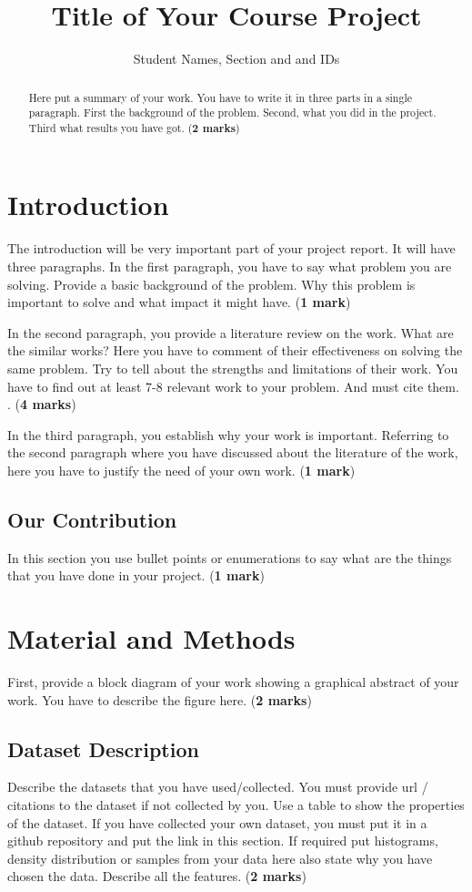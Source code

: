 \documentclass{article}
\title{Title of Your Course Project}
\author{Student Names, Section and and IDs}
\date{}
\begin{document}
\maketitle
\begin{abstract}
    Here put a summary of your work. You have to write it in three parts in a single paragraph. First the background of the problem. Second, what you did in the project. Third what results you have got. (\textbf{2 marks})
\end{abstract}

\section{Introduction} 
The introduction will be very important part of your project report. It will have three paragraphs. In the first paragraph, you have to say what problem you are solving. Provide a basic background of the problem. Why this problem is important to solve and what impact it might have. (\textbf{1 mark})

In the second paragraph, you provide a literature review on the work. What are the similar works? Here you have to comment of their effectiveness on solving the same problem. Try to tell about the strengths and limitations of their work. You have to find out at least 7-8 relevant work to your problem. And must cite them. \cite{jones2004introduction}. (\textbf{4 marks})

In the third paragraph, you establish why your work is important. Referring to the second paragraph where you have discussed about the literature of the work, here you have to justify the need of your own work. (\textbf{1 mark})

\subsection{Our Contribution}
In this section you use bullet points or enumerations to say what are the things that you have done in your project. (\textbf{1 mark})

\section{Material and Methods}
First, provide a block diagram of your work showing a graphical abstract of your work. You have to describe the figure here. (\textbf{2 marks})

\subsection{Dataset Description}
Describe the datasets that you have used/collected. You must provide url / citations to the dataset if not collected by you. Use a table to show the properties of the dataset. If you have collected your own dataset, you must put it in a github repository and put the link in this section. If required put histograms, density distribution or samples from your data here also state why you have chosen the data. Describe all the features. (\textbf{2 marks})
\end{document}

